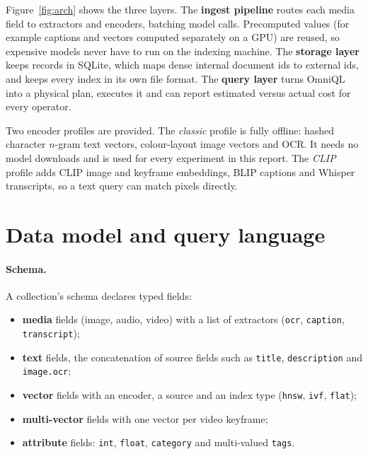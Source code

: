 \documentclass[11pt,a4paper]{article}
\newcommand{\code}[1]{\texttt{\small #1}}
\newcommand{\fig}[1]{Figure~\ref{#1}}
\begin{document}
\fig{fig:arch} shows the three layers. The \textbf{ingest pipeline} routes each media field to
extractors and encoders, batching model calls. Precomputed values (for example captions and vectors
computed separately on a GPU) are reused, so expensive models never have to run on the indexing
machine. The \textbf{storage layer} keeps records in SQLite, which maps dense internal document ids
to external ids, and keeps every index in its own file format. The \textbf{query layer} turns OmniQL
into a physical plan, executes it and can report estimated versus actual cost for every operator.

Two encoder profiles are provided. The \emph{classic} profile is fully offline: hashed character
$n$-gram text vectors, colour-layout image vectors and OCR. It needs no model downloads and is used
for every experiment in this report. The \emph{CLIP} profile adds CLIP image and keyframe embeddings,
BLIP captions and Whisper transcripts, so a text query can match pixels directly.

\section{Data model and query language}
\label{sec:model}

\paragraph{Schema.} A collection's schema declares typed fields:
\begin{itemize}
  \item \textbf{media} fields (image, audio, video) with a list of extractors (\code{ocr},
        \code{caption}, \code{transcript});
  \item \textbf{text} fields, the concatenation of source fields such as
        \code{title}, \code{description} and \code{image.ocr};
  \item \textbf{vector} fields with an encoder, a source and an index type (\code{hnsw}, \code{ivf},
        \code{flat});
  \item \textbf{multi-vector} fields with one vector per video keyframe;
  \item \textbf{attribute} fields: \code{int}, \code{float}, \code{category} and multi-valued
        \code{tags}.
\end{itemize}
\end{document}
